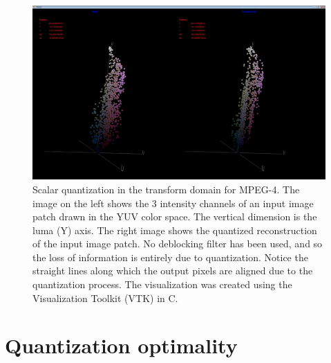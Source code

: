 								\begin{figure}[t]		
								\center	
								\includegraphics[height=0.4\textheight]{thesis/MPEG4_VTK.png}
								\caption{Scalar quantization in the transform domain for MPEG-4.  The image on the left shows the 3 intensity channels of an input image patch drawn in the YUV color space.  The vertical dimension is the luma (Y) axis.  The right image shows the quantized reconstruction of the input image patch.  No deblocking filter has been used, and so the loss of information is entirely due to quantization.  Notice the straight lines along which the output pixels are aligned due to the quantization process.  The visualization was created using the Visualization Toolkit (VTK) \cite{VTK} in C.}
								\label{fig:MPEG4_VTK}
								\end{figure}

\section{Quantization optimality}
\label{sec:quantization_optimality}



